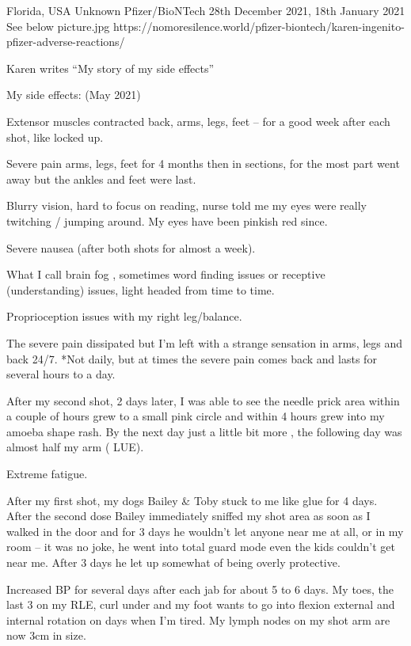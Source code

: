 {Florida, USA}
{Unknown}
{Pfizer/BioNTech}
{28th December 2021, 18th January 2021 }
{See below}
{picture.jpg}
{https://nomoresilence.world/pfizer-biontech/karen-ingenito-pfizer-adverse-reactions/}
{

Karen writes “My story of my side effects”

My side effects: (May 2021)

Extensor muscles contracted back, arms, legs, feet – for a good week after each
shot, like locked up.

Severe pain arms, legs, feet for 4 months then in sections, for the most part
went away but the ankles and feet were last.

Blurry vision, hard to focus on reading, nurse told me my eyes were really
twitching / jumping around. My eyes have been pinkish red since.

Severe nausea (after both shots for almost a week).

What I call brain fog , sometimes word finding issues or receptive
(understanding) issues, light headed from time to time.

Proprioception issues with my right leg/balance.

The severe pain dissipated but I’m left with a strange sensation in arms, legs
and back 24/7. *Not daily, but at times the severe pain comes back and lasts for
several hours to a day.

After my second shot, 2 days later, I was able to see the needle prick area
within a couple of hours grew to a small pink circle and within 4 hours grew
into my amoeba shape rash. By the next day just a little bit more , the
following day was almost half my arm ( LUE).

Extreme fatigue.

After my first shot, my dogs Bailey \& Toby stuck to me like glue for 4
days. After the second dose Bailey immediately sniffed my shot area as soon as I
walked in the door and for 3 days he wouldn’t let anyone near me at all, or in
my room – it was no joke, he went into total guard mode even the kids couldn’t
get near me. After 3 days he let up somewhat of being overly protective.

Increased BP for several days after each jab for about 5 to 6 days. My toes, the
last 3 on my RLE, curl under and my foot wants to go into flexion external and
internal rotation on days when I’m tired. My lymph nodes on my shot arm are now
3cm in size.

}

